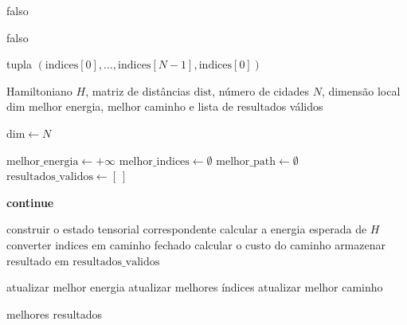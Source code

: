 \begin{apendicesenv}
\begin{algorithm}[htbp]
\begin{algorithmic}[1]
    \State \Return falso
\EndIf

    \State \Return falso
\EndIf

\State \Return tupla $(\mathrm{indices}[0], \ldots, \mathrm{indices}[N-1], \mathrm{indices}[0])$
\end{algorithmic}
\end{algorithm}

\begin{algorithm}[htbp]
\caption{Análise dos estados da base computacional}
\label{alg:analisar_estados_base}
\begin{algorithmic}[1]
\Require Hamiltoniano $H$, matriz de distâncias $\mathrm{dist}$, número de cidades $N$, dimensão local $\mathrm{dim}$
\Ensure melhor energia, melhor caminho e lista de resultados válidos

    \State $\mathrm{dim} \gets N$
\EndIf

\State $\mathrm{melhor\_energia} \gets +\infty$
\State $\mathrm{melhor\_indices} \gets \emptyset$
\State $\mathrm{melhor\_path} \gets \emptyset$
\State $\mathrm{resultados\_validos} \gets [\ ]$

        \State \textbf{continue}
    \EndIf

    \State construir o estado tensorial correspondente
    \State calcular a energia esperada de $H$
    \State converter $\mathrm{indices}$ em caminho fechado
    \State calcular o custo do caminho
    \State armazenar resultado em $\mathrm{resultados\_validos}$

        \State atualizar melhor energia
        \State atualizar melhores índices
        \State atualizar melhor caminho
    \EndIf
\EndFor

\State \Return melhores resultados
\end{algorithmic}
\end{algorithm}




\end{apendicesenv}
